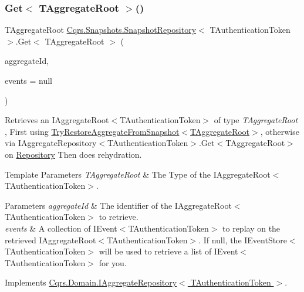 \subsubsection{\texorpdfstring{Get$<$ T\+Aggregate\+Root $>$()}{Get< TAggregateRoot >()}}
{\footnotesize\ttfamily T\+Aggregate\+Root \hyperlink{classCqrs_1_1Snapshots_1_1SnapshotRepository}{Cqrs.\+Snapshots.\+Snapshot\+Repository}$<$ T\+Authentication\+Token $>$.Get$<$ T\+Aggregate\+Root $>$ (\begin{DoxyParamCaption}\item[{Guid}]{aggregate\+Id,  }\item[{I\+List$<$ \hyperlink{interfaceCqrs_1_1Events_1_1IEvent}{I\+Event}$<$ T\+Authentication\+Token $>$$>$}]{events = {\ttfamily null} }\end{DoxyParamCaption})}



Retrieves an I\+Aggregate\+Root$<$\+T\+Authentication\+Token$>$ of type {\itshape T\+Aggregate\+Root} , First using \hyperlink{classCqrs_1_1Snapshots_1_1SnapshotRepository_a1328c103474b2b394b7af61a24455a65_a1328c103474b2b394b7af61a24455a65}{Try\+Restore\+Aggregate\+From\+Snapshot$<$\+T\+Aggregate\+Root$>$}, otherwise via I\+Aggregate\+Repository$<$\+T\+Authentication\+Token$>$.\+Get$<$\+T\+Aggregate\+Root$>$ on \hyperlink{classCqrs_1_1Snapshots_1_1SnapshotRepository_a64b1457cd45056fb7affd2aa8cd07d9e_a64b1457cd45056fb7affd2aa8cd07d9e}{Repository} Then does rehydration. 


\begin{DoxyTemplParams}{Template Parameters}
{\em T\+Aggregate\+Root} & The Type of the I\+Aggregate\+Root$<$\+T\+Authentication\+Token$>$.\\
\hline
\end{DoxyTemplParams}

\begin{DoxyParams}{Parameters}
{\em aggregate\+Id} & The identifier of the I\+Aggregate\+Root$<$\+T\+Authentication\+Token$>$ to retrieve.\\
\hline
{\em events} & A collection of I\+Event$<$\+T\+Authentication\+Token$>$ to replay on the retrieved I\+Aggregate\+Root$<$\+T\+Authentication\+Token$>$. If null, the I\+Event\+Store$<$\+T\+Authentication\+Token$>$ will be used to retrieve a list of I\+Event$<$\+T\+Authentication\+Token$>$ for you. \\
\hline
\end{DoxyParams}


Implements \hyperlink{interfaceCqrs_1_1Domain_1_1IAggregateRepository_a890633fddbd05bd3b9e9968a2de095bb_a890633fddbd05bd3b9e9968a2de095bb}{Cqrs.\+Domain.\+I\+Aggregate\+Repository$<$ T\+Authentication\+Token $>$}.

